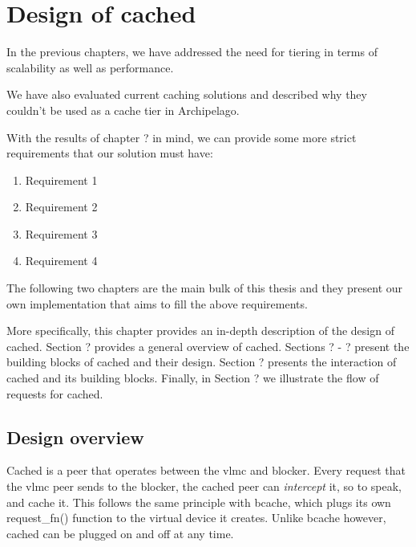 \chapter{Design of cached}\label{ch:cached-design}

In the previous chapters, we have addressed the need for tiering in terms of
scalability as well as performance. %

We have also evaluated current caching solutions and described why they couldn't 
be used as a cache tier in Archipelago. %

With the results of chapter ? in mind, we can provide some more strict 
requirements that our solution must have:

\begin{enumerate}
	\item Requirement 1
	\item Requirement 2
	\item Requirement 3
	\item Requirement 4
\end{enumerate}

The following two chapters are the main bulk of this thesis and they present our 
own implementation that aims to fill the above requirements.

More specifically, this chapter provides an in-depth description of the design 
of cached.  Section ? provides a general overview of cached. Sections ? - ?  
present the building blocks of cached and their design. Section ? presents the 
interaction of cached and its building blocks. Finally, in Section ?  we 
illustrate the flow of requests for cached.

\section{Design overview}

\begin{comment}
In order to provide a caching tier for Archipelago that would blabla our 
requirements, we had to create our own implementation. Its name is simply cached 
(\textbf{cache d}aemon) and is another XSEG peer with similar structure to those 
seen in chapter ? %
\end{comment}

Cached is a peer that operates between the vlmc and blocker. Every request that 
the vlmc peer sends to the blocker, the cached peer can \textit{intercept} it, 
so to speak, and cache it. This follows the same principle with bcache, which 
plugs its own request\_fn() function to the virtual device it creates. Unlike 
bcache however, cached can be plugged on and off at any time.

